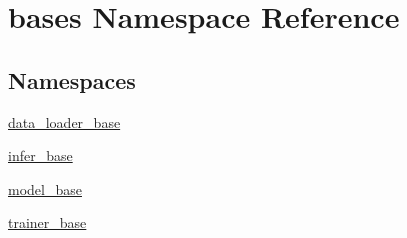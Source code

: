 \hypertarget{namespacebases}{}\section{bases Namespace Reference}
\label{namespacebases}
\subsection*{Namespaces}
\begin{DoxyCompactItemize}
\item 
 \mbox{\hyperlink{namespacebases_1_1data__loader__base}{data\+\_\+loader\+\_\+base}}
\item 
 \mbox{\hyperlink{namespacebases_1_1infer__base}{infer\+\_\+base}}
\item 
 \mbox{\hyperlink{namespacebases_1_1model__base}{model\+\_\+base}}
\item 
 \mbox{\hyperlink{namespacebases_1_1trainer__base}{trainer\+\_\+base}}
\end{DoxyCompactItemize}
